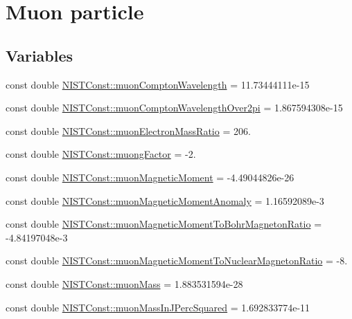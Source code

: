 \hypertarget{group___n_i_s_t_const-_muon}{}\section{Muon particle}
\label{group___n_i_s_t_const-_muon}
\subsection*{Variables}
\begin{DoxyCompactItemize}
\item 
const double \hyperlink{group___n_i_s_t_const-_muon_ga344399a1ac3bc2f57614ccdca4f4f1c1}{N\+I\+S\+T\+Const\+::muon\+Compton\+Wavelength} = 11.\+73444111e-\/15
\item 
const double \hyperlink{group___n_i_s_t_const-_muon_ga4a55b49a126bc1f308e50dfa6869cd76}{N\+I\+S\+T\+Const\+::muon\+Compton\+Wavelength\+Over2pi} = 1.\+867594308e-\/15
\item 
const double \hyperlink{group___n_i_s_t_const-_muon_gadb71fd23b688fbab91f52a53eee8081c}{N\+I\+S\+T\+Const\+::muon\+Electron\+Mass\+Ratio} = 206.
\item 
const double \hyperlink{group___n_i_s_t_const-_muon_ga777044d532403774e1c4a55ff020766d}{N\+I\+S\+T\+Const\+::muong\+Factor} = -\/2.
\item 
const double \hyperlink{group___n_i_s_t_const-_muon_gacd182505756807ab247465449d821110}{N\+I\+S\+T\+Const\+::muon\+Magnetic\+Moment} = -\/4.\+49044826e-\/26
\item 
const double \hyperlink{group___n_i_s_t_const-_muon_ga555a2705f41a9f392e90147c58ae7527}{N\+I\+S\+T\+Const\+::muon\+Magnetic\+Moment\+Anomaly} = 1.\+16592089e-\/3
\item 
const double \hyperlink{group___n_i_s_t_const-_muon_ga417520e932b056d62595de6d9a75be3e}{N\+I\+S\+T\+Const\+::muon\+Magnetic\+Moment\+To\+Bohr\+Magneton\+Ratio} = -\/4.\+84197048e-\/3
\item 
const double \hyperlink{group___n_i_s_t_const-_muon_gac809a61292c5b8c5fe4679bd944729d8}{N\+I\+S\+T\+Const\+::muon\+Magnetic\+Moment\+To\+Nuclear\+Magneton\+Ratio} = -\/8.
\item 
const double \hyperlink{group___n_i_s_t_const-_muon_ga4fed15b8e94009be07c0a5f17af9ffb8}{N\+I\+S\+T\+Const\+::muon\+Mass} = 1.\+883531594e-\/28
\item 
const double \hyperlink{group___n_i_s_t_const-_muon_ga98b4dada2be08e51ae363d18d745d60e}{N\+I\+S\+T\+Const\+::muon\+Mass\+In\+J\+Perc\+Squared} = 1.\+692833774e-\/11

\end{DoxyCompactItemize}
